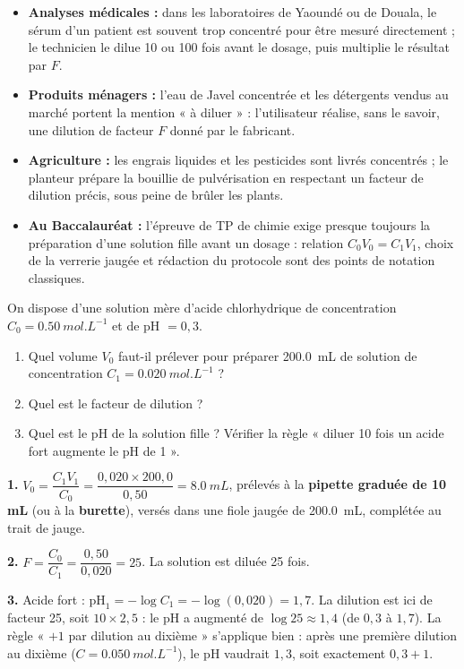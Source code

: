 \documentclass[11pt]{article}
\begin{document}
\begin{savaistu}
\begin{itemize}
\item \textbf{Analyses médicales :} dans les laboratoires de Yaoundé ou de Douala, le sérum d'un patient est souvent trop concentré pour être mesuré directement ; le technicien le dilue 10 ou 100 fois avant le dosage, puis multiplie le résultat par $F$.
\item \textbf{Produits ménagers :} l'eau de Javel concentrée et les détergents vendus au marché portent la mention « à diluer » : l'utilisateur réalise, sans le savoir, une dilution de facteur $F$ donné par le fabricant.
\item \textbf{Agriculture :} les engrais liquides et les pesticides sont livrés concentrés ; le planteur prépare la bouillie de pulvérisation en respectant un facteur de dilution précis, sous peine de brûler les plants.
\item \textbf{Au Baccalauréat :} l'épreuve de TP de chimie exige presque toujours la préparation d'une solution fille avant un dosage : relation $C_0V_0 = C_1V_1$, choix de la verrerie jaugée et rédaction du protocole sont des points de notation classiques.
\end{itemize}
\end{savaistu}

\begin{exercice}
On dispose d'une solution mère d'acide chlorhydrique de concentration $C_0 = \SI{0,50}{mol.L^{-1}}$ et de pH $= 0{,}3$.
\begin{enumerate}
\item Quel volume $V_0$ faut-il prélever pour préparer \SI{200,0}{mL} de solution de concentration $C_1 = \SI{0,020}{mol.L^{-1}}$ ?
\item Quel est le facteur de dilution ?
\item Quel est le pH de la solution fille ? Vérifier la règle « diluer 10 fois un acide fort augmente le pH de 1 ».
\end{enumerate}
\end{exercice}

\begin{corrige}
\textbf{1.} $V_0 = \dfrac{C_1 V_1}{C_0} = \dfrac{0{,}020 \times 200{,}0}{0{,}50} = \SI{8,0}{mL}$, prélevés à la \textbf{pipette graduée de 10 mL} (ou à la \textbf{burette}), versés dans une fiole jaugée de \SI{200,0}{mL}, complétée au trait de jauge.

\textbf{2.} $F = \dfrac{C_0}{C_1} = \dfrac{0{,}50}{0{,}020} = 25$. La solution est diluée 25 fois.

\textbf{3.} Acide fort : $\mathrm{pH}_1 = -\log C_1 = -\log(0{,}020) = 1{,}7$. La dilution est ici de facteur 25, soit $10 \times 2{,}5$ : le pH a augmenté de $\log 25 \approx 1{,}4$ (de $0{,}3$ à $1{,}7$). La règle « $+1$ par dilution au dixième » s'applique bien : après une première dilution au dixième ($C = \SI{0,050}{mol.L^{-1}}$), le pH vaudrait $1{,}3$, soit exactement $0{,}3 + 1$.
\end{corrige}
\end{document}

